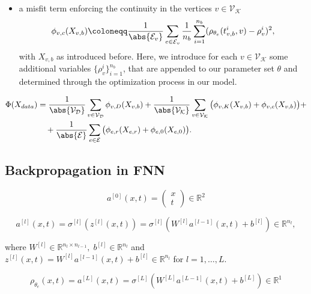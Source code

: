 \begin{itemize}
    \item a misfit term enforcing the continuity in the vertices $v \in \mathcal{V}_\mathcal{K}$ \begin{equation*} \phi_{v,c} (X_{v,b}) \coloneqq \frac{1}{\abs{\mathcal{E}_v}} \sum_{e \in \mathcal{E}_v} \frac{1}{n_b} \sum_{i=1}^{n_b} ( \rho_{\theta_e} (t_{v,b}^i, v) - \rho_{v}^i)^2, \end{equation*} with $X_{v,b}$ as introduced before. Here, we introduce for each $v \in \mathcal{V}_\mathcal{K}$ some additional variables $\{\rho_{v}^i\}_{i=1}^{n_b}$, that are appended to our parameter set $\theta$ and determined through the optimization process in our model.
\end{itemize}

\begin{align*} \label{eq:loss}
    \Phi(X_{data}) & =  \frac{1}{\abs{\mathcal{V}_\mathcal{D}}} \sum_{v \in \mathcal{V}_\mathcal{D}} \phi_{v,D}(X_{v,b}) + \frac{1}{\abs{\mathcal{V}_\mathcal{K}}} \sum_{v \in \mathcal{V}_\mathcal{K}} \big( \phi_{v,K} (X_{v,b}) + \phi_{v,c}(X_{v,b}) \big) + \\
    & \quad + \frac{1}{\abs{\mathcal{E}}} \sum_{e \in \mathcal{E}} \big( \phi_{e,r} (X_{e,r}) + \phi_{e,0} (X_{e,0}) \big). 
\end{align*}

\subsection{Backpropagation in FNN}

\begin{equation*}
    a^{[0]}(x,t) = \begin{pmatrix} x \\ t \end{pmatrix} \in \mathbb{R}^2
\end{equation*}

\begin{equation*}
    a^{[l]}(x,t) = \sigma^{[l]} (z^{[l]}(x,t)) = \sigma^{[l]} (W^{[l]} a^{[l-1]}(x,t) + b^{[l]}) \in \mathbb{R}^{n_l}, 
\end{equation*}

where $W^{[l]} \in \mathbb{R}^{n_l \times n_{l-1}}, \; b^{[l]} \in \mathbb{R}^{n_l}$ and $z^{[l]}(x,t) = W^{[l]} a^{[l-1]}(x,t) + b^{[l]} \in \mathbb{R}^{n_l}$ for $l = 1, \ldots, L$.

\begin{equation*}
    \rho_{\theta_e}(x, t) = a^{[L]}(x,t) = \sigma^{[L]} (W^{[L]} a^{[L-1]}(x,t) + b^{[L]}) \in \mathbb{R}^{1} 
\end{equation*}

